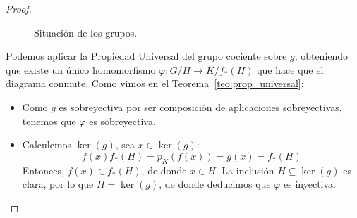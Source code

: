 \begin{lema}
\begin{proof}
\begin{figure}[H]
\begin{tikzcd}
            \end{tikzcd}
            \caption{Situación de los grupos.}
        \end{figure}
        \noindent
        Podemos aplicar la Propiedad Universal del grupo cociente sobre $g$, obteniendo que existe un único homomorfismo $\varphi:G/H\to K/f_\ast(H)$ que hace que el diagrama conmute. Como vimos en el Teorema~\ref{teo:prop_universal}:
        \begin{itemize}
            \item Como $g$ es sobreyectiva por ser composición de aplicaciones sobreyectivas, tenemos que $\varphi$ es sobreyectiva.
            \item Calculemos $\ker(g)$, sea $x\in \ker(g)$:
                \begin{equation*}
                    f(x)f_\ast(H) = p_K(f(x)) = g(x) = f_\ast(H)
                \end{equation*}
                Entonces, $f(x) \in f_\ast(H)$, de donde $x\in H$. La inclusión $H\subseteq \ker(g)$ es clara, por lo que $H = \ker(g)$, de donde deducimos que $\varphi$ es inyectiva.
        \end{itemize}
    \end{proof}
\end{lema}

